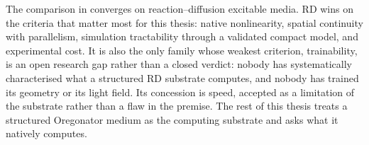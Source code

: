 The comparison in  converges on reaction--diffusion excitable media. RD wins on the criteria that matter most for this thesis: native nonlinearity, spatial continuity with parallelism, simulation tractability through a validated compact model, and experimental cost. It is also the only family whose weakest criterion, trainability, is an open research gap rather than a closed verdict: nobody has systematically characterised what a structured RD substrate computes, and nobody has trained its geometry or its light field. Its concession is speed, accepted as a limitation of the substrate rather than a flaw in the premise. The rest of this thesis treats a structured Oregonator medium as the computing substrate and asks what it natively computes.
